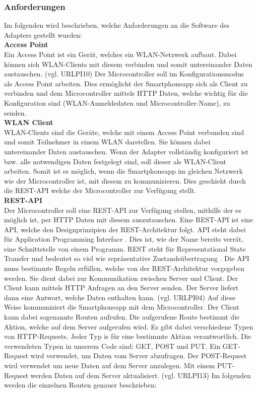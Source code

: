 \documentclass[]{article}
\begin{document}
\subsubsection{Anforderungen}
Im folgenden wird beschrieben, welche Anforderungen an die Software des Adapters gestellt wurden: \newline \\
\textbf{Access Point} \\
Ein Access Point ist ein Gerät, welches ein WLAN-Netzwerk aufbaut. Dabei können sich WLAN-Clients mit diesem verbinden und somit untereinander Daten austauschen. (vgl. URLPI10)
Der Microcontroller soll im Konfigurationsmodus als Access Point arbeiten. Dies ermöglicht der Smartphoneapp sich als Client zu verbinden und dem Microcontroller mittels HTTP Daten, welche wichtig für die Konfiguration sind (WLAN-Anmeldedaten und Microcontroller-Name), zu senden. \newline \\
\textbf{WLAN Client} \\
WLAN-Clients sind die Geräte, welche mit einem Access Point verbunden sind und somit Teilnehmer in einem WLAN darstellen. Sie können dabei untereinander Daten austauschen.
Wenn der Adapter vollständig konfiguriert ist bzw. alle notwendigen Daten festgelegt sind, soll dieser als WLAN-Client arbeiten. Somit ist es möglich, wenn die Smartphoneapp im gleichen Netzwerk wie der Microcontroller ist, mit diesem zu kommunizieren. Dies geschieht durch die REST-API welche der Microcontroller zur Verfügung stellt. \newline \\
\textbf{REST-API} \\
Der Microcontroller soll eine REST-API zur Verfügung stellen, mithilfe der es möglich ist, per HTTP Daten mit diesem auszutauschen. Eine REST-API ist eine API, welche den Designprinzipien der REST-Architektur folgt. API steht dabei für \glqq Application Programming Interface \grqq{}. Dies ist, wie der Name bereits verrät, eine Schnittstelle von einem Programm. REST steht für \glqq Representational State Transfer \grqq{} und bedeutet so viel wie \glqq repräsentative Zustandsübertragung \grqq{}. Die API muss bestimmte Regeln erfüllen, welche von der REST-Architektur vorgegeben werden. Sie dient dabei zur Kommunikation zwischen Server und Client. Der Client kann mittels HTTP Anfragen an den Server senden. Der Server liefert dann eine Antwort, welche Daten enthalten kann. (vgl. URLPI04) Auf diese Weise kommuniziert die Smartphoneapp mit dem Microcontroller. Der Client kann dabei sogenannte Routen aufrufen. Die aufgerufene Route bestimmt die Aktion, welche auf dem Server aufgerufen wird. Es gibt dabei verschiedene Typen von HTTP-Requests. Jeder Typ is für eine bestimmte Aktion verantwortlich. Die verwendeten Typen in unserem Code sind: GET, POST und PUT. Ein GET-Request wird verwendet, um Daten vom Server abzufragen. Der POST-Request wird verwendet um neue Daten auf dem Server anzulegen. Mit einem PUT-Request werden Daten auf dem Server aktualisiert. (vgl. URLPI13) Im folgenden werden die einzelnen Routen genauer beschrieben: \newline \\
\end{document}
